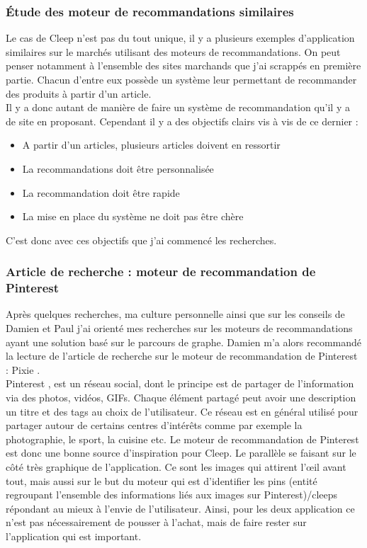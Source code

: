 \documentclass{article} %
\begin{document}
\subsubsection{Étude des moteur de recommandations similaires}

Le cas de Cleep n'est pas du tout unique, il y a plusieurs exemples d'application similaires sur le marchés utilisant des moteurs de recommandations. On peut penser notamment à l'ensemble des sites marchands que j'ai scrappés en première partie. Chacun d'entre eux possède un système leur permettant de recommander des produits à partir d'un article.\\
Il y a donc autant de manière de faire un système de recommandation qu'il y a de site en proposant. Cependant il y a des objectifs clairs vis à vis de ce dernier :
\begin{itemize}
	\itemsep 0em
	\item A partir d'un articles, plusieurs articles doivent en ressortir
	\item La recommandations doit être personnalisée
	\item La recommandation doit être rapide
	\item La mise en place du système ne doit pas être chère
\end{itemize}
C'est donc avec ces objectifs que j'ai commencé les recherches.

\subsubsection{Article de recherche : moteur de recommandation de Pinterest\\}
Après quelques recherches, ma culture personnelle  ainsi que sur les conseils de Damien et Paul j'ai orienté mes recherches sur les moteurs de recommandations ayant une solution basé sur le parcours de graphe. Damien m'a alors recommandé la lecture de l'article de recherche sur le moteur de recommandation de Pinterest : Pixie \cite{pixie}.\\
Pinterest \cite{Pinterest}, est un réseau social, dont le principe est de partager de l'information via des photos, vidéos, GIFs. Chaque élément partagé peut avoir une description un titre et des tags au choix de l'utilisateur. Ce réseau est en général utilisé pour partager autour de certains centres d'intérêts comme par exemple la photographie, le sport, la cuisine etc. Le moteur de recommandation de Pinterest est donc une bonne source d'inspiration pour Cleep. Le parallèle se faisant sur le côté très graphique de l'application. Ce sont les images qui attirent l'œil avant tout, mais aussi sur le but du moteur qui est d'identifier les pins (entité regroupant l'ensemble des informations liés aux images sur Pinterest)/cleeps répondant au mieux à l'envie de l'utilisateur. Ainsi, pour les deux application ce n'est pas nécessairement de pousser à l'achat, mais de faire rester sur l'application qui est important.\\
\end{document}
